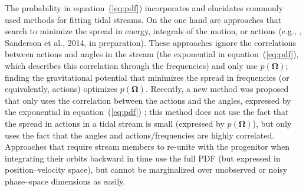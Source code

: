 \documentclass[12pt,preprint]{aastex}
\newcommand{\etal}{et al.}
\newcommand{\eg}{e.g.}
\newcommand{\eqnname}{equation}
\renewcommand{\vec}[1]{\ensuremath{\mathbf{#1}}}
\newcommand{\veco}{\ensuremath{\vec{\Omega}}}
\begin{document}
The probability in \eqnname~(\ref{eq:pdf}) incorporates and elucidates
commonly used methods for fitting tidal streams. On the one hand are
approaches that search to minimize the spread in energy, integrals of
the motion, or actions (\eg, \citealt{Binney08a,Penarrubia12a},
Sanderson \etal, 2014, in preparation). These approaches ignore the
correlations between actions and angles in the stream (the exponential
in \eqnname~(\ref{eq:pdf}), which describes this correlation through
the frequencies) and only use $p(\veco)$; finding the gravitational
potential that minimizes the spread in frequencies (or equivalently,
actions) optimizes $p(\veco)$. Recently, a new method was proposed
that only uses the correlation between the actions and the angles,
expressed by the exponential in \eqnname~(\ref{eq:pdf})
\citep{Sanders13b}; this method does not use the fact that the spread
in actions in a tidal stream is small (expressed by $p(\veco)$), but
only uses the fact that the angles and actions/frequencies are highly
correlated. Approaches that require stream members to re-unite with
the progenitor when integrating their orbits backward in time
\citep{Johnston99a,PriceWhelan13a} use the full PDF (but expressed in
position--velocity space), but cannot be marginalized over unobserved
or noisy phase--space dimensions as easily.
\end{document}
